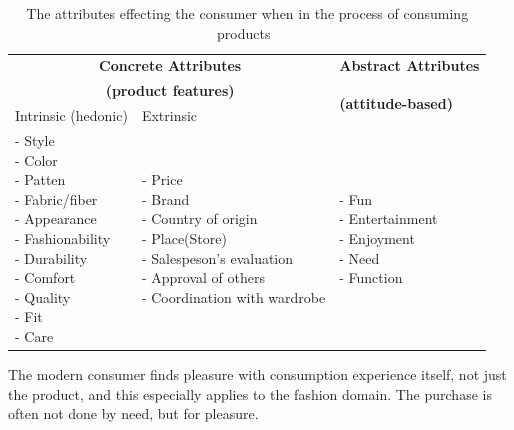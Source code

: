 \begin{table}[H]
    \centering
    \begin{tabular}{l|l|l}
      \multicolumn{2}{c|}{\textbf{Concrete Attributes}} & \textbf{Abstract Attributes} \\
      \multicolumn{2}{c|}{\textbf{(product features)}} & \multirow{2}{*}{\textbf{(attitude-based)}} \\ \cline{1-2}
      Intrinsic (hedonic)   & Extrinsic & \\ \hline
      \pbox{4cm}{
          - Style \\
          - Color \\
          - Patten \\
          - Fabric/fiber \\
          - Appearance \\
          - Fashionability \\
          - Durability \\
          - Comfort \\
          - Quality \\
          - Fit \\
          - Care \\
      } & \pbox{6cm}{
          - Price \\
          - Brand \\
          - Country of origin \\
          - Place(Store) \\
          - Salespeson's evaluation \\
          - Approval of others \\
          - Coordination with wardrobe \\
      } & \pbox{4cm}{
          - Fun \\
          - Entertainment \\
          - Enjoyment \\
          - Need \\
          - Function \\
        } \\ \hline
    \end{tabular}
    \label{table:ConsumersPurchaseDec}
    \caption [Consumers' Purchase Decisions]{The attributes effecting the consumer when in the process of consuming products~\cite{dutton2006}}
\end{table}

The modern consumer finds pleasure with consumption experience itself, not just the product, and this especially applies to the fashion domain.
The purchase is often not done by need, but for pleasure.

